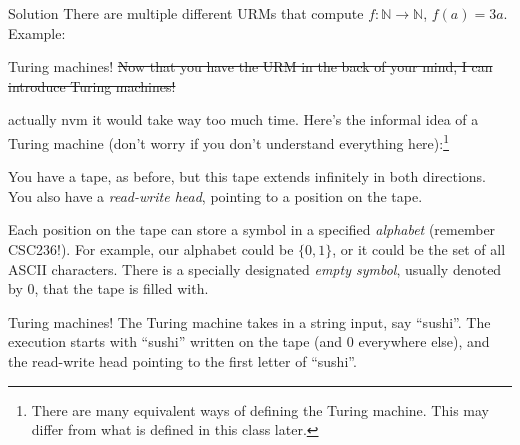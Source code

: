 \documentclass{beamer}
\begin{document}
\begin{frame}{Solution}
There are multiple different URMs that compute $f: \mathbb N \to \mathbb N$, $f(a) = 3a$. Example:
\begin{center}
\begin{algorithmic}[1]
\end{algorithmic}
\end{center}
\end{frame}

\begin{frame}{Turing machines!}
\sout{Now that you have the URM in the back of your mind, I can introduce Turing machines!}

actually nvm it would take way too much time. Here's the informal idea of a Turing machine (don't worry if you don't understand everything here):\footnote{There are many equivalent ways of defining the Turing machine. This may differ from what is defined in this class later.}

\vspace{2mm}

You have a tape, as before, but this tape extends infinitely in both directions.
You also have a \textit{read-write head}, pointing to a position on the tape.

\vspace{2mm}

Each position on the tape can store a symbol in a specified \textit{alphabet} (remember CSC236!). For example, our alphabet could be $\{0, 1\}$, or it could be the set of all ASCII characters. There is a specially designated \textit{empty symbol}, usually denoted by $0$, that the tape is filled with. 
\end{frame}

\begin{frame}{Turing machines!}
The Turing machine takes in a string input, say ``sushi''. The execution starts with ``sushi'' written on the tape (and $0$ everywhere else), and the read-write head pointing to the first letter of ``sushi''.

\begin{center}
\end{center}
\end{frame}
\end{document}
